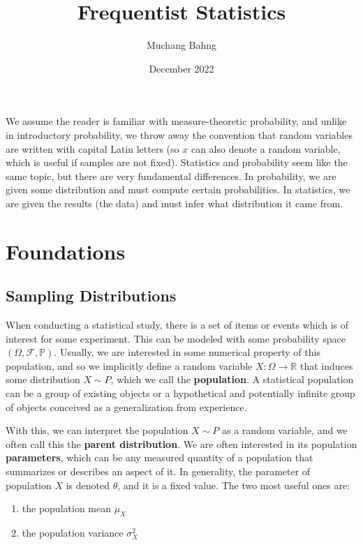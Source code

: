 \documentclass{article}
\begin{document}
\title{Frequentist Statistics}
\author{Muchang Bahng}
\date{December 2022}

\maketitle
\tableofcontents
\pagebreak

  We assume the reader is familiar with measure-theoretic probability, and unlike in introductory probability, we throw away the convention that random variables are written with capital Latin letters (so $x$ can also denote a random variable, which is useful if samples are not fixed). Statistics and probability seem like the same topic, but there are very fundamental differences. In probability, we are given some distribution and must compute certain probabilities. In statistics, we are given the results (the data) and must infer what distribution it came from. 

\section{Foundations}

  \subsection{Sampling Distributions}

    \begin{definition}
      When conducting a statistical study, there is a set of items or events which is of interest for some experiment. This can be modeled with some probability space $(\Omega, \mathcal{F}, \mathbb{P})$. Usually, we are interested in some numerical property of this population, and so we implicitly define a random variable $X: \Omega \longrightarrow \mathbb{R}$ that induces some distribution $X \sim P$, which we call the \textbf{population}. A statistical population can be a group of existing objects or a hypothetical and potentially infinite group of objects conceived as a generalization from experience. 

      With this, we can interpret the population $X \sim P$ as a random variable, and we often call this the \textbf{parent distribution}. We are often interested in its population \textbf{parameters}, which can be any measured quantity of a population that summarizes or describes an aspect of it. In generality, the parameter of population $X$ is denoted $\theta$, and it is a fixed value. The two most useful ones are: 
      \begin{enumerate}
        \item the population mean $\mu_X$ 
        \item the population variance $\sigma^2_X$ 
      \end{enumerate}
    \end{definition}
\end{document}
